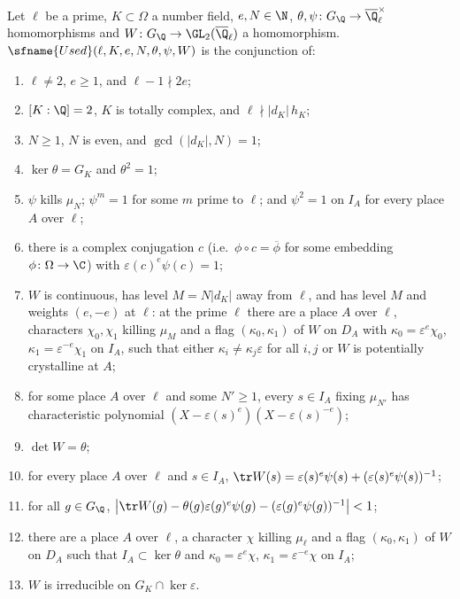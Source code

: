 \begin{definition}\label{pf:kato:def:used}
Let $\ell$ be a prime, $K\subset\Omega$ a number field, $e,N\in\N$, $\theta,\psi\colon G_\Q\to\katoQlb^\times$
homomorphisms and $W\colon G_\Q\to\GL_2(\katoQlb)$ a homomorphism. $\sfname{Used}(\ell,K,e,N,\theta,\psi,W)$ is
the conjunction of:
\begin{enumerate}[label=(U\arabic*),leftmargin=*]
\item\label{pf:kato:U1} $\ell\ne2$, $e\ge1$, and $\ell-1\nmid2e$;
\item\label{pf:kato:U2} $[K:\Q]=2$, $K$ is totally complex, and $\ell\nmid|d_K|\,h_K$;
\item\label{pf:kato:U3} $N\ge1$, $N$ is even, and $\gcd(|d_K|,N)=1$;
\item\label{pf:kato:U4} $\ker\theta=G_K$ and $\theta^2=1$;
\item\label{pf:kato:U5} $\psi$ kills $\mu_N$; $\psi^m=1$ for some $m$ prime to $\ell$; and $\psi^2=1$ on $I_A$ for
  every place $A$ over $\ell$;
\item\label{pf:kato:U6} there is a complex conjugation $c$ (i.e.\ $\phi\circ c=\overline{\phi}$ for some embedding
  $\phi\colon\Omega\to\C$) with $\varepsilon(c)^e\psi(c)=1$;
\item\label{pf:kato:U7} $W$ is continuous, has level $M=N|d_K|$ away from $\ell$, and has level $M$ and weights
  $(e,-e)$ at $\ell$: at the prime $\ell$ there are a place $A$ over $\ell$, characters $\chi_0,\chi_1$ killing
  $\mu_M$ and a flag $(\kappa_0,\kappa_1)$ of $W$ on $D_A$ with $\kappa_0=\varepsilon^e\chi_0$,
  $\kappa_1=\varepsilon^{-e}\chi_1$ on $I_A$, such that either $\kappa_i\ne\kappa_j\varepsilon$ for all $i,j$ or $W$ is
  potentially crystalline at $A$;
\item\label{pf:kato:U8} for some place $A$ over $\ell$ and some $N'\ge1$, every $s\in I_A$ fixing $\mu_{N'}$ has
  characteristic polynomial $(X-\varepsilon(s)^e)(X-\varepsilon(s)^{-e})$;
\item\label{pf:kato:U9} $\det W=\theta$;
\item\label{pf:kato:U10} for every place $A$ over $\ell$ and $s\in I_A$,
  $\tr W(s)=\varepsilon(s)^e\psi(s)+(\varepsilon(s)^e\psi(s))^{-1}$;
\item\label{pf:kato:U11} for all $g\in G_\Q$,
  $\bigl|\tr W(g)-\theta(g)\varepsilon(g)^e\psi(g)-(\varepsilon(g)^e\psi(g))^{-1}\bigr|<1$;
\item\label{pf:kato:U12} there are a place $A$ over $\ell$, a character $\chi$ killing $\mu_\ell$ and a flag
  $(\kappa_0,\kappa_1)$ of $W$ on $D_A$ such that $I_A\subset\ker\theta$ and $\kappa_0=\varepsilon^e\chi$,
  $\kappa_1=\varepsilon^{-e}\chi$ on $I_A$;
\item\label{pf:kato:U13} $W$ is irreducible on $G_K\cap\ker\varepsilon$.
\end{enumerate}
\end{definition}

